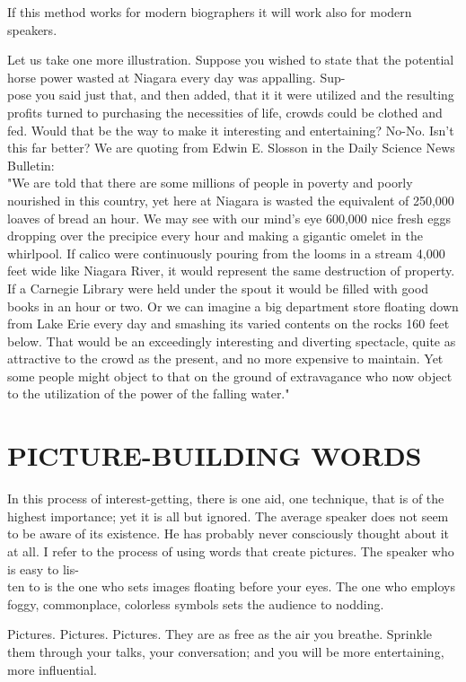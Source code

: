 \documentclass[10pt]{article}
\begin{document}
If this method works for modern biographers it will work also for modern speakers.

Let us take one more illustration. Suppose you wished to state that the potential horse power wasted at Niagara every day was appalling. Sup-\\
pose you said just that, and then added, that it it were utilized and the resulting profits turned to purchasing the necessities of life, crowds could be clothed and fed. Would that be the way to make it interesting and entertaining? No-No. Isn't this far better? We are quoting from Edwin E. Slosson in the Daily Science News Bulletin:\\
"We are told that there are some millions of people in poverty and poorly nourished in this country, yet here at Niagara is wasted the equivalent of 250,000 loaves of bread an hour. We may see with our mind's eye 600,000 nice fresh eggs dropping over the precipice every hour and making a gigantic omelet in the whirlpool. If calico were continuously pouring from the looms in a stream 4,000 feet wide like Niagara River, it would represent the same destruction of property. If a Carnegie Library were held under the spout it would be filled with good books in an hour or two. Or we can imagine a big department store floating down from Lake Erie every day and smashing its varied contents on the rocks 160 feet below. That would be an exceedingly interesting and diverting spectacle, quite as attractive to the crowd as the present, and no more expensive to maintain. Yet some people might object to that on the ground of extravagance who now object to the utilization of the power of the falling water."

\section*{PICTURE-BUILDING WORDS}
In this process of interest-getting, there is one aid, one technique, that is of the highest importance; yet it is all but ignored. The average speaker does not seem to be aware of its existence. He has probably never consciously thought about it at all. I refer to the process of using words that create pictures. The speaker who is easy to lis-\\
ten to is the one who sets images floating before your eyes. The one who employs foggy, commonplace, colorless symbols sets the audience to nodding.

Pictures. Pictures. Pictures. They are as free as the air you breathe. Sprinkle them through your talks, your conversation; and you will be more entertaining, more influential.
\end{document}

